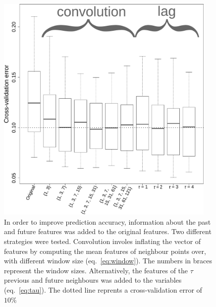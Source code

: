 \begin{figure}[h!]
  \centering    
    \includegraphics[width=0.95\textwidth]{figures/temporal_integration.pdf}
  \caption{
  In order to improve prediction accuracy, information about the past and future features was added to the original features.
  Two different strategies were tested. Convolution involes inflating the vector of features by computing the mean features of neighbour points over, with different window size (eq.~\ref{eq:window}).
  The numbers in braces represent the window sizes. Alternatively, the features of the $\tau$ previous and future neighbours was added to the variables (eq.~\ref{eq:tau}).
  The dotted line reprents a cross-validation error of $10\%$
  \label{fig:temporal_integration}
  }
\end{figure}
